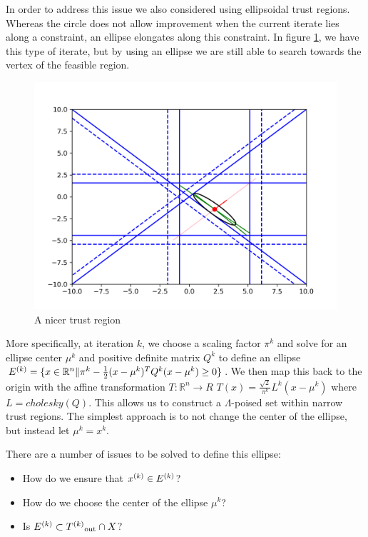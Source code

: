 In order to address this issue we also considered using ellipsoidal trust regions.
Whereas the circle does not allow improvement when the current iterate lies along a constraint, an ellipse elongates along this constraint.
In figure \ref{ellipse_adv}, we have this type of iterate, but by using an ellipse we are still able to search towards the vertex of the feasible region.
\begin{figure}[h]
    \centering
    \includegraphics[scale=0.4]{images/advantage_of_ellipse_2.png}
    \caption{A nicer trust region}
    \label{ellipse_adv}
\end{figure}


More specifically, at iteration $k$, we choose a scaling factor $\pi^k$ and solve for an ellipse center $\mu^k$ and positive definite matrix $Q^k$ to define an ellipse
$ {E^{(k)}} = \{x \in \mathbb R^n \| \pi^k - \frac 1 2 (x - \mu^{k})^TQ^{k}(x - \mu^{k}) \ge 0 \}$.
We then map this back to the origin with the affine transformation $T : \mathbb R^n \to R$ $T(x) = \frac {\sqrt{2}}{\pi^k} L^k(x-\mu^k)$ where $L = cholesky(Q)$.
This allows us to construct a $\Lambda$-poised set within narrow trust regions.
The simplest approach is to not change the center of the ellipse, but instead let $\mu^k = x^k$.

There are a number of issues to be solved to define this ellipse:
\begin{itemize}
\item How do we ensure that ${x}^{(k)} \in {E^{(k)}}$?
\item How do we choose the center of the ellipse $\mu^k$?
\item Is $ {E^{(k)}} \subset {T^{(k)}}_{\text{out}} \cap X$?
\end{itemize}

